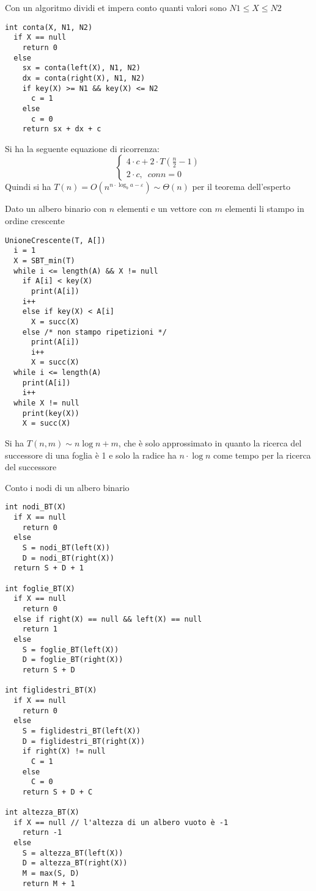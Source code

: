 \documentclass[a4paper,12pt,oneside,tikz]{book}
\begin{document}
\begin{esercizio}
Con un algoritmo dividi et impera conto quanti valori sono $N1\leq X\leq N2$
\begin{verbatim}
int conta(X, N1, N2)
  if X == null
    return 0
  else
    sx = conta(left(X), N1, N2)
    dx = conta(right(X), N1, N2)
    if key(X) >= N1 && key(X) <= N2
      c = 1
    else
      c = 0
    return sx + dx + c
\end{verbatim}
Si ha la seguente equazione di ricorrenza:
$$\begin{cases}
4\cdot c +2\cdot T\left(\frac{n}{2}-1\right)\\
2\cdot c,\,\,\, con n=0
\end{cases}
$$
Quindi si ha $T(n)=O(n^{n\cdot \log_b a-\varepsilon})\sim \Theta(n)$ per il teorema dell'esperto
\end{esercizio}
\begin{esercizio}
Dato un albero binario con $n$ elementi e un vettore con $m$ elementi li stampo in ordine crescente
\begin{verbatim}
UnioneCrescente(T, A[])
  i = 1
  X = SBT_min(T)
  while i <= length(A) && X != null
    if A[i] < key(X)
      print(A[i])
    i++
    else if key(X) < A[i]
      X = succ(X)
    else /* non stampo ripetizioni */
      print(A[i])
      i++
      X = succ(X)
  while i <= length(A)
    print(A[i])
    i++
  while X != null
    print(key(X))
    X = succ(X)
\end{verbatim}
Si ha $T(n,m)\sim n\log n+m$, che è solo approssimato in quanto la ricerca del successore di una foglia è 1 e solo la radice ha $n\cdot \log n$ come tempo per la ricerca del successore
\end{esercizio}
\begin{esercizio}
Conto i nodi di un albero binario
\begin{verbatim}
int nodi_BT(X)
  if X == null
    return 0
  else
    S = nodi_BT(left(X))
    D = nodi_BT(right(X))
  return S + D + 1

int foglie_BT(X)
  if X == null
    return 0
  else if right(X) == null && left(X) == null
    return 1
  else
    S = foglie_BT(left(X))
    D = foglie_BT(right(X))
    return S + D

int figlidestri_BT(X)
  if X == null
    return 0
  else 
    S = figlidestri_BT(left(X))
    D = figlidestri_BT(right(X))
    if right(X) != null
      C = 1
    else
      C = 0
    return S + D + C

int altezza_BT(X)
  if X == null // l'altezza di un albero vuoto è -1
    return -1
  else
    S = altezza_BT(left(X))
    D = altezza_BT(right(X))
    M = max(S, D)
    return M + 1
\end{verbatim}
\end{esercizio}
\end{document}
